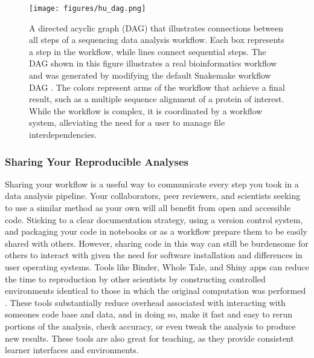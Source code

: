 \documentclass[10pt,letterpaper]{article}
\begin{document}
\begin{figure}
\texttt{[image: figures/hu\_dag.png]}
\caption{A directed acyclic graph (DAG) that illustrates connections between all steps of a sequencing data analysis workflow. Each box represents a step in the workflow, while lines connect sequential steps. The DAG shown in this figure illustrates a real bioinformatics workflow and was generated by modifying the default Snakemake workflow DAG \cite{brown2019exploring}. The colors represent arms of the workflow that achieve a final result, such as a multiple sequence alignment of a protein of interest. While the workflow is complex, it is coordinated by a workflow system, alleviating the need for a user to manage file interdependencies.}
\label{fig:sgc_workflow}
\end{figure}

\subsubsection*{Sharing Your Reproducible Analyses} 
Sharing your workflow is a useful way to communicate every step you took in a data analysis pipeline. 
Your collaborators, peer reviewers, and scientists seeking to use a similar method as your own will all benefit from open and accessible code. 
Sticking to a clear documentation strategy, using a version control system, and packaging your code in notebooks or as a workflow prepare them to be easily shared with others. 
However, sharing code in this way can still be burdensome for others to interact with given the need for software installation and differences in user operating systems. 
Tools like Binder, Whole Tale, and Shiny apps can reduce the time to reproduction by other scientists by constructing controlled environments identical to those in which the original computation was performed \cite{Jupyter2018, brinckman2019computing}. 
These tools substantially reduce overhead associated with interacting with someones code base and data, and in doing so, make it fast and easy to rerun portions of the analysis, check accuracy, or even tweak the analysis to produce new results. 
These tools are also great for teaching, as they provide consistent learner interfaces and environments. 


\end{document}
